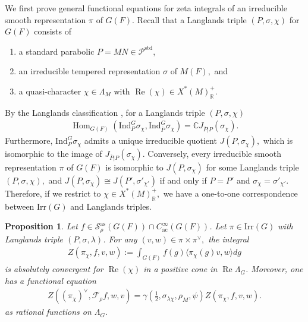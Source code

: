 \documentclass[10pt]{amsart}
\newtheorem{proposition}[theorem]{Proposition}
\theoremstyle{definition}
\numberwithin{equation}{section}
\DeclareMathOperator{\Hom}{\mathrm{Hom}}
\numberwithin{equation}{subsection}
\newcommand{\RR}{\mathbb{R}}
\newcommand{\CC}{\mathbb{C}}
\renewcommand{\Re}{\mathop{\mathrm{Re}}}
\begin{document}
We first prove general functional equations for zeta integrals of an irreducible smooth representation $\pi$ of $G(F)$. Recall that a Langlands triple $(P,\sigma,\chi)$ for $G(F)$ consists of 
\begin{enumerate}
    \item a standard parabolic $P=MN\in \mathcal{P}^{\mathrm{std}}$,
    \item an irreducible tempered representation $\sigma$ of $M(F),$ and
    \item a quasi-character $\chi\in \Lambda_M$ with $\Re(\chi)\in X^\ast(M)^+_\RR.$  
\end{enumerate}
By the Langlands classification \cite{Silb:classification, BW:book, Representation-p-adic}, for a Langlands triple $(P,\sigma,\chi)$ 
\begin{align*}\Hom_{G(F)}(\mathrm{Ind}_P^G \sigma_\chi, \mathrm{Ind}_{\overline{P}}^G\sigma_\chi)=\CC J_{\overline{P}|P}(\sigma_\chi).
\end{align*}
Furthermore, $\mathrm{Ind}_P^G \sigma_\chi$ admits a unique irreducible quotient $J(P,\sigma_\chi),$ which is isomorphic to the image of $J_{\overline{P}|P}(\sigma_\chi).$ Conversely, every irreducible smooth  representation $\pi$ of $G(F)$ is isomorphic to $J(P,\sigma_\chi)$ for some Langlands triple $(P,\sigma, \chi),$ and $J(P,\sigma_\chi)\cong J(P',\sigma'_{\chi'})$ if and only if $P=P'$ and $\sigma_\chi=\sigma'_{\chi'}.$ Therefore, if we restrict to $\chi\in X^\ast(M)_\RR^+,$ we have a one-to-one correspondence between $\mathrm{Irr}(G)$ and Langlands triples.


\begin{proposition}\label{prop:generalFE}
     Let $f\in \mathcal{S}_\rho^{\mathrm{as}}(G(F))\cap C^{\infty}_{\mathrm{ac}}(G(F))$. Let $\pi\in \mathrm{Irr}(G)$ with Langlands triple $(P,\sigma,\lambda)$. For any $(v,w)\in \pi\times \pi^\lor,$ the integral 
     \begin{align*}
         Z(\pi_\chi,f,v,w):=\int_{G(F)} f(g)\langle \pi_\chi(g)v,w\rangle dg
     \end{align*}
     is absolutely convergent for $\Re(\chi)$ in a positive cone in $\Re\Lambda_G$. Moreover, one has a functional equation
        \begin{align*}
            Z((\pi_\chi)^\lor,\mathcal{F}_\rho f,w,v)=\gamma(\tfrac{1}{2},\sigma_{\lambda\chi},\rho_M,\psi)Z(\pi_{\chi},f,v,w).
        \end{align*}
        as rational functions on $\Lambda_G.$
\end{proposition}
\end{document}
